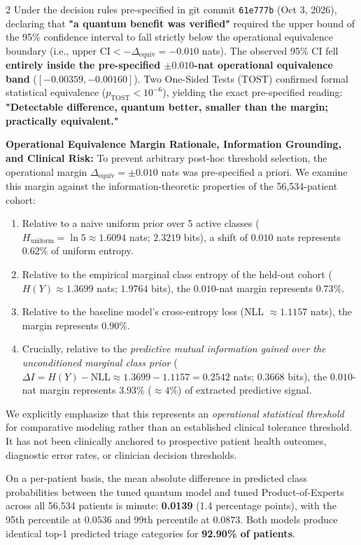 \documentclass[10pt,a4paper,twoside]{article}
\begin{document}
\begin{multicols}{2}
Under the decision rules pre-specified in git commit \texttt{61e777b} (Oct 3, 2026), declaring that \textbf{"a quantum benefit was verified"} required the upper bound of the 95\% confidence interval to fall strictly below the operational equivalence boundary (i.e., $\text{upper CI} < -\Delta_{\text{equiv}} = -0.010$ nats). The observed 95\% CI fell \textbf{entirely inside the pre-specified $\pm 0.010$-nat operational equivalence band} ($[-0.00359, -0.00160]$). Two One-Sided Tests (TOST) \cite{schuirmann1987,lakens2017} confirmed formal statistical equivalence ($p_{\text{TOST}} < 10^{-6}$), yielding the exact pre-specified reading: \textbf{"Detectable difference, quantum better, smaller than the margin; practically equivalent."}

\noindent\textbf{Operational Equivalence Margin Rationale, Information Grounding, and Clinical Risk:} To prevent arbitrary post-hoc threshold selection, the operational margin $\Delta_{\text{equiv}} = \pm 0.010$ nats was pre-specified a priori. We examine this margin against the information-theoretic properties of the 56,534-patient cohort:
\begin{enumerate}
  \setlength{\itemsep}{1pt}
  \setlength{\parskip}{0pt}
  \item Relative to a naive uniform prior over 5 active classes ($H_{\text{uniform}} = \ln 5 \approx 1.6094$ nats; $2.3219$ bits), a shift of $0.010$ nats represents $0.62\%$ of uniform entropy.
  \item Relative to the empirical marginal class entropy of the held-out cohort ($H(Y) \approx 1.3699$ nats; $1.9764$ bits), the $0.010$-nat margin represents $0.73\%$.
  \item Relative to the baseline model's cross-entropy loss (NLL $\approx 1.1157$ nats), the margin represents $0.90\%$.
  \item Crucially, relative to the \textit{predictive mutual information gained over the unconditioned marginal class prior} ($\Delta I = H(Y) - \text{NLL} \approx 1.3699 - 1.1157 = 0.2542$ nats; $0.3668$ bits), the $0.010$-nat margin represents $\mathbf{3.93\%}$ ($\approx 4\%$) of extracted predictive signal.
\end{enumerate}
We explicitly emphasize that this represents an \textit{operational statistical threshold} for comparative modeling rather than an established clinical tolerance threshold. It has not been clinically anchored to prospective patient health outcomes, diagnostic error rates, or clinician decision thresholds. 

On a per-patient basis, the mean absolute difference in predicted class probabilities between the tuned quantum model and tuned Product-of-Experts across all 56,534 patients is minute: \textbf{0.0139} (1.4 percentage points), with the 95th percentile at $0.0536$ and 99th percentile at $0.0873$. Both models produce identical top-1 predicted triage categories for \textbf{92.90\% of patients}.


\end{multicols}
\end{document}
